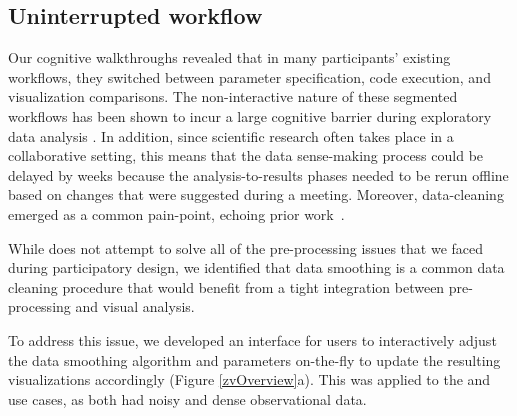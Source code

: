 \subsection{Uninterrupted workflow}
\par Our cognitive walkthroughs revealed that in many participants' existing workflows, they switched between parameter specification, code execution, and visualization comparisons. The non-interactive nature of these segmented workflows has been shown to incur a large cognitive barrier during exploratory data analysis \cite{Kery2017}. In addition, since scientific research often takes place in a collaborative setting, this means that the data sense-making process could be delayed by weeks because the analysis-to-results phases needed to be rerun offline based on changes that were suggested during a meeting. Moreover, data-cleaning emerged as a common pain-point, echoing prior work~\cite{kandel2012profiler,Guo2011}.


 While \zv does not attempt to solve all of the pre-processing issues that we faced during participatory design, we identified that data smoothing is a common data cleaning procedure%
that would benefit from a tight integration between pre-processing and visual analysis.  
\par To address this issue, we developed an interface for users to interactively adjust the data smoothing algorithm and parameters on-the-fly to update the resulting visualizations accordingly (Figure \ref{zvOverview}a). This was applied to the \matsci and \astro use cases, as both had noisy and dense observational data. 

